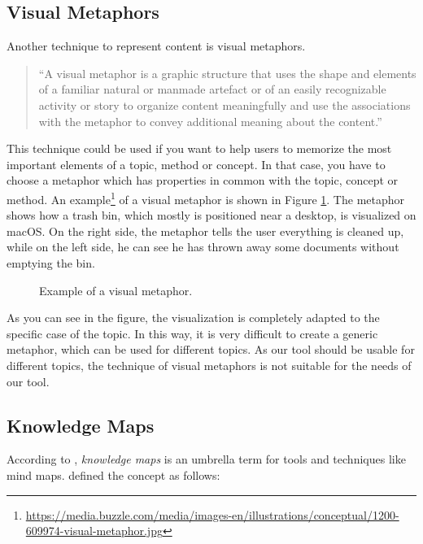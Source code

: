 \subsection{Visual Metaphors}\label{sec:visual-metaphors}
Another technique to represent content is visual metaphors.

\begin{quote}
``A visual metaphor is a graphic structure that uses the shape and elements of a familiar natural or manmade artefact or of an easily recognizable activity or story to organize content meaningfully and use the associations with the metaphor to convey additional meaning about the content.'' \hfill \citep{eppler-2006}
\end{quote}

This technique could be used if you want to help users to memorize the most important elements of a topic, method or concept. In that case, you have to choose a metaphor which has properties in common with the topic, concept or method. \citep{eppler-2006} An example\footnote{\url{https://media.buzzle.com/media/images-en/illustrations/conceptual/1200-609974-visual-metaphor.jpg}} of a visual metaphor is shown in Figure \ref{fig:visual-metaphor}. The metaphor shows how a trash bin, which mostly is positioned near a desktop, is visualized on macOS. On the right side, the metaphor tells the user everything is cleaned up, while on the left side, he can see he has thrown away some documents without emptying the bin.

\begin{figure}[H]
	\centering
	\caption{Example of a visual metaphor.}
	\label{fig:visual-metaphor}
\end{figure}

As you can see in the figure, the visualization is completely adapted to the specific case of the topic. In this way, it is very difficult to create a generic metaphor, which can be used for different topics. As our tool should be usable for different topics, the technique of visual metaphors is not suitable for the needs of our tool.


\subsection{Knowledge Maps}\label{sec:knowledge-maps}
According to \cite{knowledgemapsbalaid}, \textit{knowledge maps} is an umbrella term for tools and techniques like mind maps. \cite{knowledgemapsodonnell} defined the concept as follows:

